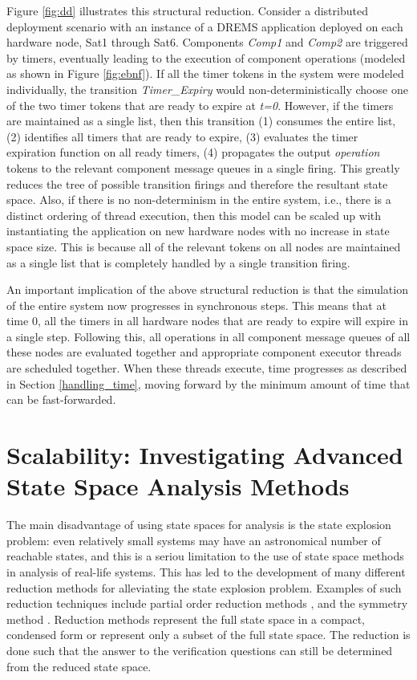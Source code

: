 Figure \ref{fig:dd} illustrates this structural reduction. Consider a distributed deployment scenario with an instance of a DREMS application deployed on each hardware node, Sat1 through Sat6. Components \emph{Comp1} and \emph{Comp2} are triggered by timers, eventually leading to the execution of component operations (modeled as shown in Figure \ref{fig:ebnf}). If all the timer tokens in the system were modeled individually, the transition \emph{Timer\_Expiry} would non-deterministically choose one of the two timer tokens that are ready to expire at \emph{t=0}. However, if the timers are maintained as a single list, then this transition (1) consumes the entire list, (2) identifies all timers that are ready to expire, (3) evaluates the timer expiration function on all ready timers, (4) propagates the output \emph{operation} tokens to the relevant component message queues in a single firing. This greatly reduces the tree of possible transition firings and therefore the resultant state space. Also, if there is no non-determinism in the entire system, i.e., there is a distinct ordering of thread execution, then this model can be scaled up with instantiating the application on new hardware nodes with no increase in state space size. This is because all of the relevant tokens on all nodes are maintained as a single list that is completely handled by a single transition firing. 

An important implication of the above structural reduction is that the simulation of the entire system now progresses in synchronous steps. This means that at time 0, all the timers in all hardware nodes that are ready to expire will expire in a single step. Following this, all operations in all component message queues of all these nodes are evaluated together and appropriate component executor threads are scheduled together. When these threads execute, time progresses as described in Section \ref{handling_time}, moving forward by the minimum amount of time that can be fast-forwarded.

\newpage
\section{Scalability: Investigating Advanced State Space Analysis Methods}

The main disadvantage of using state spaces for analysis is the state explosion problem: even relatively small systems may have an astronomical number of reachable states, and this is a seriou limitation to the use of state space methods in analysis of real-life systems. This has led to the development of many different reduction methods for alleviating the state explosion problem. Examples of such reduction techniques include partial order reduction methods \cite{peled1993all, valmari1990stubborn, wolper1993partial}, and the symmetry method \cite{jensen1996condensed}. Reduction methods represent the full state space in a compact, condensed form or represent only a subset of the full state space. The reduction is done such that the answer to the verification questions can still be determined from the reduced state space. 

